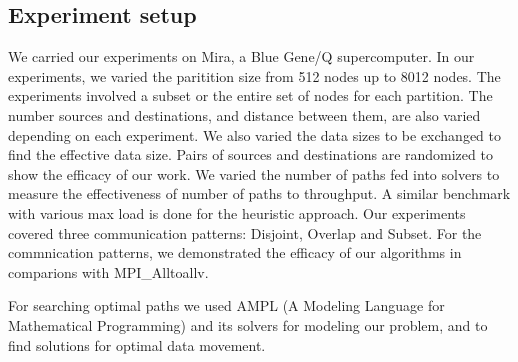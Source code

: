 \subsection{Experiment setup}

We carried our experiments on Mira, a Blue Gene/Q supercomputer. In our experiments, we varied the paritition size from 512 nodes up to 8012 nodes. The experiments involved a subset or the entire set of nodes for each partition. The number sources and destinations, and distance between them, are also varied depending on each experiment. We also varied the data sizes to be exchanged to find the effective data size. Pairs of sources and destinations are randomized to show the efficacy of our work. We varied the number of paths fed into solvers to measure the effectiveness of number of paths to throughput. A similar benchmark with various max load is done for the heuristic approach. Our experiments covered three communication patterns: Disjoint, Overlap and Subset. For the commnication patterns, we demonstrated the efficacy of our algorithms in comparions with MPI\_Alltoallv.

For searching optimal paths we used AMPL (A Modeling Language for Mathematical Programming) and its solvers \cite{AMPL} for modeling our problem, and to find solutions for optimal data movement.
